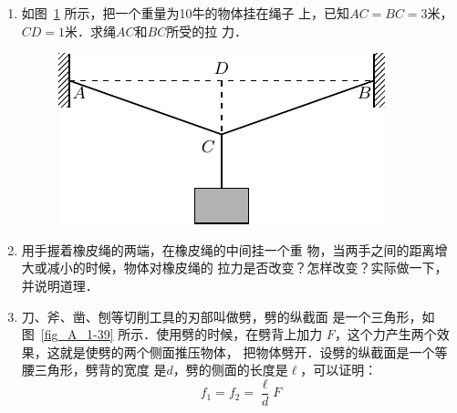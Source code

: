 \begin{enumerate}
\item 如图~\ref{fig_A_1-38} 所示，把一个重量为10牛的物体挂在绳子
上，已知$AC=BC=3$米，$CD=1$米．求绳$AC$和$BC$所受的拉
力．
\begin{figure}[htbp]
    \centering
    \includegraphics{fig/A/1-38.pdf}
    \caption{} \label{fig_A_1-38} 
\end{figure} 


\item   用手握着橡皮绳的两端，在橡皮绳的中间挂一个重
物，当两手之间的距离增大或减小的时候，物体对橡皮绳的
拉力是否改变？怎样改变？实际做一下，并说明道理．

\item  刀、斧、凿、刨等切削工具的刃部叫做劈，劈的纵截面
是一个三角形，如图~\ref{fig_A_1-39} 所示．使用劈的时候，在劈背上加力
$F$，这个力产生两个效果，这就是使劈的两个侧面推压物体，
把物体劈开．设劈的纵截面是一个等腰三角形，劈背的宽度
是$d$，劈的侧面的长度是$\ell$，可以证明：
\[f_1=f_2=\frac{\ell} {d} F \]


\end{enumerate}
